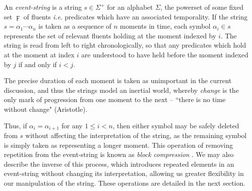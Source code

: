 \documentclass[a4paper,11pt]{article}
\begin{document}
An \textit{event-string} is a string $s \in \Sigma^+$ for an alphabet 
$\Sigma$, the powerset of some fixed set $\digamma$ of fluents \textit{i.e.} 
predicates which have an associated temporality. If the 
string $s = \alpha_1\cdots\alpha_n$ is taken as a sequence of $n$ moments in 
time, each symbol $\alpha_i \in s$ represents the set of relevant fluents 
holding at the 
moment indexed by $i$. The string is read from left to right chronologically, 
so that any predicates which hold at the moment at index $i$ are understood to 
have held before the moment indexed by $j$ if and only if $i < j$.

The precise duration of each moment is taken as unimportant in the current 
discussion, 
and thus the strings model an inertial world, whereby \textit{change} is the 
only mark of progression from one moment to the next -- ``there is no time 
without change" (Aristotle).

Thus, if $\alpha_i = \alpha_{i+1}$ for any 
$1 \leq i < n$, then either symbol may be safely deleted from $s$ without 
affecting the interpretation of the string, as the remaining symbol is simply 
taken as representing a longer moment. This operation of removing 
repetition from 
the event-string is known as \textit{block compression} 
\citep{fernando2016prior}. We may also describe 
the inverse of this process, which introduces repeated elements in an 
event-string without changing its interpretation, allowing us greater 
flexibility in our manipulation of the string. These operations are detailed 
in the next section.
\end{document}
